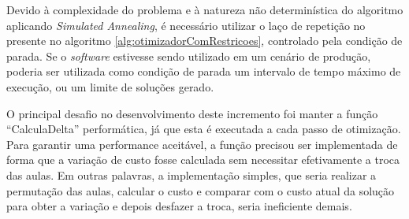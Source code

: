 Devido à complexidade do problema e à natureza não determinística do algoritmo aplicando \textit{Simulated Annealing}, é necessário utilizar o laço de repetição no presente no algoritmo \ref{alg:otimizadorComRestricoes}, controlado pela condição de parada. Se o \textit{software} estivesse sendo utilizado em um cenário de produção, poderia ser utilizada como condição de parada um intervalo de tempo máximo de execução, ou um limite de soluções gerado.

O principal desafio no desenvolvimento deste incremento foi manter a função ``CalculaDelta'' performática, já que esta é executada a cada passo de otimização. Para garantir uma performance aceitável, a função precisou ser implementada de forma que a variação de custo fosse calculada sem necessitar efetivamente a troca das aulas. Em outras palavras, a implementação simples, que seria realizar a permutação das aulas, calcular o custo e comparar com o custo atual da solução para obter a variação e depois desfazer a troca, seria ineficiente demais.
